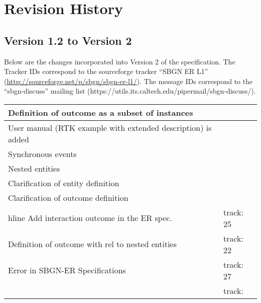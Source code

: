 \chapter{Revision History}

\section{Version 1.2 to Version 2}

Below are the changes incorporated into Version 2 of the \SBGNERLone specification. The Tracker IDs correspond to the sourceforge tracker ``SBGN ER L1'' (\url{http://sourceforge.net/p/sbgn/sbgn-er-l1/}). The message IDs correspond to the ``sbgn-discuss'' mailing list (https://utils.its.caltech.edu/pipermail/sbgn-discuss/).

\begin{center}
\label{tab:revision history 2}
\tablelasttail{\hline}
\begin{supertabular}{|p{0.75\textwidth}|p{0.25\textwidth}|}\hline
Definition of outcome as a subset of instances &   \\\hline
User manual (RTK example with extended description) is added &   \\\hline
Synchronous events &   \\\hline
Nested entities & \\\hline
Clarification of entity definition & \\\hline
Clarification of outcome definition & \\hline
Add interaction outcome in the ER spec. & track:  25 \\\hline
Definition of outcome with rel to nested entities  & track:  22 \\\hline
Error in SBGN-ER Specifications & track: 27  \\\hline
 & track:  \\\hline
\end{supertabular}
\end{center}


